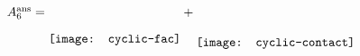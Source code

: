 \documentclass{standalone}
\begin{document}
$
 A_6^{\text{ans}}=\raisebox{-7.5mm}{\texttt{[image: cyclic-fac]}}+\raisebox{-8.5mm}{\texttt{[image: cyclic-contact]}}
$
\end{document}
